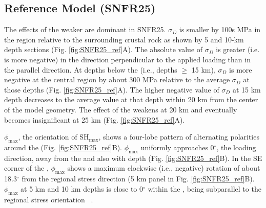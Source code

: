\documentclass[draft]{agujournal2018}
\begin{document}
\subsection{Reference Model (SNFR25)} \label{Ref_Model}
The effects of the weaker  are dominant in SNFR25. $\sigma_D$ is smaller by 100s MPa in the  region relative to the surrounding crustal rock as shown by 5 and 10-km depth sections (Fig. \ref{fig:SNFR25_ref}A). The absolute value of $\sigma_D$ is greater (i.e. is more negative) in the direction perpendicular to the applied loading than in the parallel direction. At depths below the  (i.e., depths $\ge$ 15 km), $\sigma_D$ is more negative at the central region by about 300 MPa relative to the average $\sigma_D$ at those depths (Fig. \ref{fig:SNFR25_ref}A). The higher negative value of $\sigma_D$ at 15 km depth decreases to the average value at that depth within 20 km from the center of the model geometry. The effect of the  weakens at 20 km and eventually becomes insignificant at 25 km (Fig. \ref{fig:SNFR25_ref}A).

$\phi_{\max}$, the orientation of SH$_{\max}$, shows a four-lobe pattern of alternating polarities around the  (Fig. \ref{fig:SNFR25_ref}B). $\phi_{\max}$ uniformly approaches 0$^\circ$, the loading direction, away from the  and also with depth (Fig. \ref{fig:SNFR25_ref}B). In the SE corner of the , $\phi_{\max}$ shows a maximum clockwise (i.e., negative) rotation of about 18.3$^\circ$ from the regional stress direction (5 km panel in Fig. \ref{fig:SNFR25_ref}B). 
$\phi_{\max}$ at 5 km and 10 km depths is close to 0$^\circ$ within the , being subparallel to the regional stress orientation ~\citep{Zoback_1992}.
\end{document}
